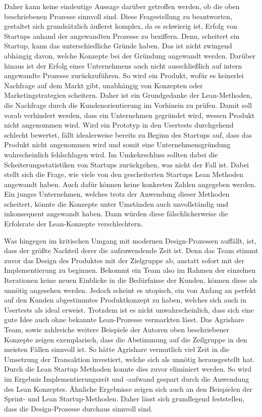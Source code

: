 Daher kann keine eindeutige Aussage darüber getroffen werden, ob die oben beschriebenen Prozesse sinnvoll sind. Diese Fragestellung zu beantworten, gestaltet sich grundsätzlich äußerst komplex, da es schwierig ist, Erfolg von Startups anhand der angewandten Prozesse zu beziffern. Denn, scheitert ein Startup, kann das unterschiedliche Gründe haben. Das ist nicht zwingend abhängig davon, welche Konzepte bei der Gründung angewandt werden. Darüber hinaus ist der Erfolg eines Unternehmens auch nicht ausschließlich auf intern angewandte Prozesse zurückzuführen. So wird ein Produkt, wofür es keinerlei Nachfrage auf dem Markt gibt, unabhängig von Konzepten oder Marketingstrategien scheitern. Daher ist ein Grundgedanke der Lean-Methoden, die Nachfrage durch die Kundenorientierung im Vorhinein zu prüfen. Damit soll vorab verhindert werden, dass ein Unternehmen gegründet wird, wessen Produkt nicht angenommen wird. Wird ein Prototyp in den Usertests durchgehend schlecht bewertet, fällt idealerweise bereits zu Beginn des Startups auf, dass das Produkt nicht angenommen wird und somit eine Unternehmensgründung wahrscheinlich fehlschlagen wird. Im Umkehrschluss sollten dabei die Scheiterungsstatistiken von Startups zurückgehen, was nicht der Fall ist. Dabei stellt sich die Frage, wie viele von den gescheiterten Startups Lean Methoden angewandt haben. Auch dafür können keine konkreten Zahlen angegeben werden. Ein junges Unternehmen, welches trotz der Anwendung dieser Methoden scheitert, könnte die Konzepte unter Umständen auch unvollständig und inkonsequent angewandt haben. Dann würden diese fälschlicherweise die Erfolsrate der Lean-Konzepte verschlechtern. 

Was hingegen im kritischen Umgang mit modernen Design-Prozessen auffällt, ist, dass der größte Nachteil derer die aufzuwendende Zeit ist. Denn das Team stimmt zuvor das Design des Produktes mit der Zielgruppe ab, anstatt sofort mit der Implementierung zu beginnen. Bekommt ein Team also im Rahmen der einzelnen Iterationen keine neuen Einblicke in die Bedürfnisse der Kunden, können diese als unnötig angesehen werden. Jedoch scheint es utopisch, ein von Anfang an perfekt auf den Kunden abgestimmtes Produktkonzept zu haben, welches sich auch in Usertests als ideal erweist. Trotzdem ist es nicht unwahrscheinlich, dass sich eine gute Idee auch ohne bekannte Lean-Prozesse vermarkten lässt. Das Agrishare Team, sowie zahlreiche weitere Beispiele der Autoren oben beschriebener Konzepte zeigen exemplarisch, dass die Abstimmung auf die Zeilgruppe in den meisten Fällen sinnvoll ist. So hätte Agrishare vermutlich viel Zeit in die Umsetzung der Transaktion investiert, welche sich als unnötig herausgestellt hat. Durch die Lean Startup Methoden konnte dies zuvor eliminiert werden. So wird im Ergebnis Implementierungszeit und -aufwand gespart durch die Anwendung des Lean Konzeptes. Ähnliche Ergebnisse zeigen sich auch an den Beispielen der Sprint- und Lean Startup-Methoden. Daher lässt sich grundlegend feststellen, dass die Design-Prozesse durchaus sinnvoll sind.

